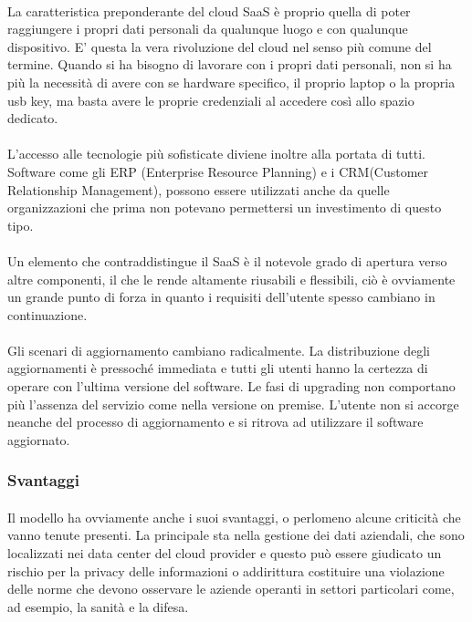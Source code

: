 \paragraph{}
La caratteristica preponderante del cloud SaaS è proprio quella di poter raggiungere i propri dati personali da qualunque luogo e con qualunque dispositivo. E' questa la vera rivoluzione del cloud nel senso più comune del termine. Quando si ha bisogno di lavorare con i propri dati personali, non si ha più la necessità di avere con se hardware specifico, il proprio laptop o la propria usb key, ma basta avere le proprie credenziali al accedere così allo spazio dedicato. 
\paragraph{}
L'accesso alle tecnologie più sofisticate diviene inoltre alla portata di tutti. Software come gli ERP (Enterprise Resource Planning) e i CRM(Customer Relationship Management), possono essere utilizzati anche da quelle organizzazioni che prima non potevano permettersi un investimento di questo tipo.
\paragraph{} 
Un elemento che contraddistingue il SaaS è il notevole grado di apertura verso altre componenti, il che le rende altamente riusabili e flessibili, ciò è ovviamente un grande punto di forza in quanto i requisiti dell'utente spesso cambiano in continuazione.
\paragraph{}
Gli scenari di aggiornamento cambiano radicalmente. La distribuzione degli aggiornamenti è pressoché immediata e tutti gli utenti hanno la certezza di operare con l'ultima versione del software. Le fasi di upgrading non comportano più l'assenza del servizio come nella versione on premise. L'utente non si accorge neanche del processo di aggiornamento e si ritrova ad utilizzare il software aggiornato.
\subsubsection{Svantaggi}
\paragraph{}
Il modello ha ovviamente anche i suoi svantaggi, o perlomeno alcune criticità che vanno tenute presenti. La principale sta nella gestione dei dati aziendali, che sono localizzati nei data center del cloud provider e questo può essere giudicato un rischio per la privacy delle informazioni o addirittura costituire una violazione delle norme che devono osservare le aziende operanti in settori particolari come, ad esempio, la sanità e la difesa.
